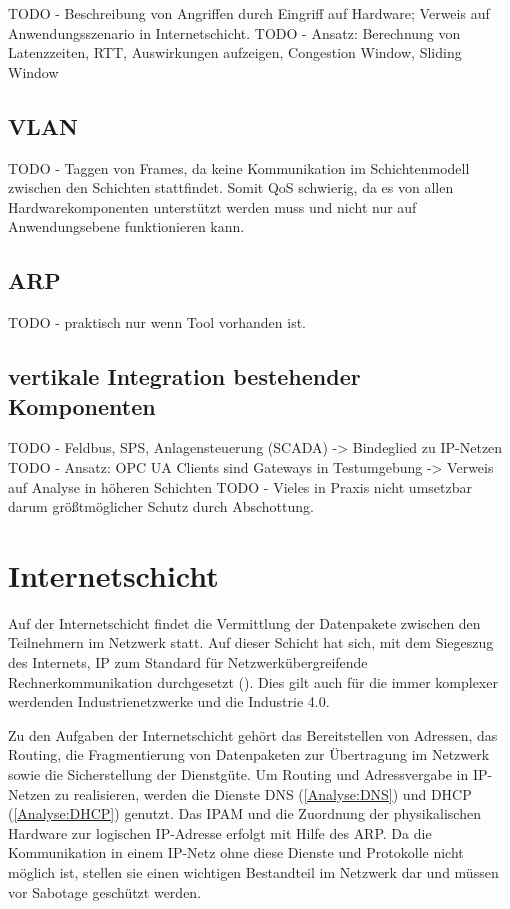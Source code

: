 TODO - Beschreibung von Angriffen durch Eingriff auf Hardware; Verweis auf Anwendungsszenario in Internetschicht.
TODO - Ansatz: Berechnung von Latenzzeiten, RTT, Auswirkungen aufzeigen, Congestion Window, Sliding Window

\subsection{\ac{VLAN}}
\label{Analyse:VLAN}
TODO - Taggen von Frames, da keine Kommunikation im Schichtenmodell zwischen den Schichten stattfindet. Somit QoS schwierig, da es von allen Hardwarekomponenten unterstützt werden muss und nicht nur auf Anwendungsebene funktionieren kann.

\subsection{\ac{ARP}}
\label{Analyse:ARP}
TODO - praktisch nur wenn Tool vorhanden ist.

\subsection{vertikale Integration bestehender Komponenten}
TODO - Feldbus, SPS, Anlagensteuerung (SCADA) -> Bindeglied zu IP-Netzen
TODO - Ansatz: OPC UA Clients sind Gateways in Testumgebung -> Verweis auf Analyse in höheren Schichten
TODO - Vieles in Praxis nicht umsetzbar darum größtmöglicher Schutz durch Abschottung.

\section{Internetschicht}
Auf der Internetschicht findet die Vermittlung der Datenpakete zwischen den Teilnehmern im Netzwerk statt. Auf dieser Schicht hat sich, mit dem Siegeszug des Internets, \ac{IP} zum Standard für Netzwerkübergreifende Rechnerkommunikation durchgesetzt (\cite{meinel2011}). Dies gilt auch für die immer komplexer werdenden Industrienetzwerke und die Industrie 4.0.

Zu den Aufgaben der Internetschicht gehört das Bereitstellen von Adressen, das Routing, die Fragmentierung von Datenpaketen zur Übertragung im Netzwerk sowie die Sicherstellung der Dienstgüte. Um Routing und Adressvergabe in \ac{IP}-Netzen zu realisieren, werden die Dienste \ac{DNS} (\autoref{Analyse:DNS}) und \ac{DHCP} (\autoref{Analyse:DHCP}) genutzt. Das \ac{IPAM} und die Zuordnung der physikalischen Hardware zur logischen \ac{IP}-Adresse erfolgt mit Hilfe des \ac{ARP}. Da die Kommunikation in einem \ac{IP}-Netz ohne diese Dienste und Protokolle nicht möglich ist, stellen sie einen wichtigen Bestandteil im Netzwerk dar und müssen vor Sabotage geschützt werden. 

